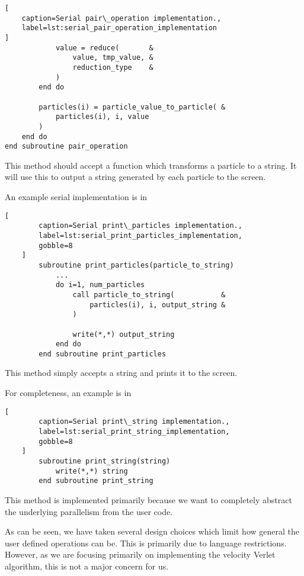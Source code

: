 \begin{description}
\begin{lstlisting}[
    caption=Serial pair\_operation implementation.,
    label=lst:serial_pair_operation_implementation
]
            value = reduce(       &
                value, tmp_value, &
                reduction_type    & 
            )
        end do

        particles(i) = particle_value_to_particle( &
            particles(i), i, value
        )
    end do
end subroutine pair_operation
\end{lstlisting}

\item[print\_particles]
    This method should accept a function which transforms a particle
    to a string. It will use this to output a string generated by
    each particle to the screen.

    An example serial implementation is in

    \begin{lstlisting}[
        caption=Serial print\_particles implementation.,
        label=lst:serial_print_particles_implementation,
        gobble=8
    ]
        subroutine print_particles(particle_to_string)
            ...
            do i=1, num_particles
                call particle_to_string(           &
                    particles(i), i, output_string &
                )

                write(*,*) output_string
            end do
        end subroutine print_particles
    \end{lstlisting}

\item[print\_string]
    This method simply accepts a string and prints it to the screen.

    For completeness, an example is in

    \begin{lstlisting}[
        caption=Serial print\_string implementation.,
        label=lst:serial_print_string_implementation,
        gobble=8
    ]
        subroutine print_string(string)
            write(*,*) string
        end subroutine print_string
    \end{lstlisting}

    This method is implemented primarily because we want to completely
    abstract the underlying parallelism from the user code.
\end  {description}

As can be seen, we have taken several design choices which limit how
general the user defined operations can be.
%
This is primarily due to language restrictions.
%
However, as we are focusing primarily on implementing the velocity
Verlet algorithm, this is not a major concern for us.

